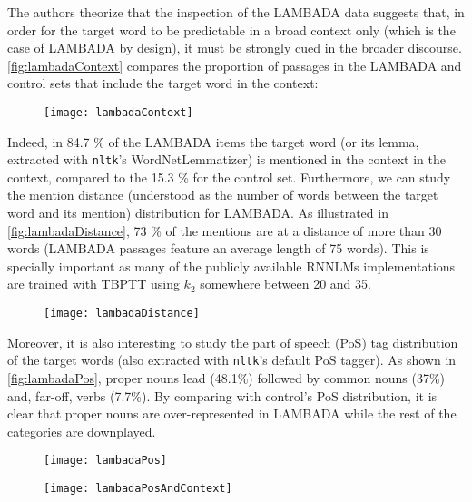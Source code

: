 The authors theorize that the inspection of the LAMBADA data suggests that, in order for the target word to be predictable in a broad context only (which is the case of LAMBADA by design), it must be strongly cued in the broader discourse. \autoref{fig:lambadaContext} compares the proportion of passages in the LAMBADA and control sets that include the target word in the context:

\begin{figure}[H]
	\centering
	\texttt{[image: lambadaContext]}
	\label{fig:lambadaContext}
\end{figure}

Indeed, in 84.7 \% of the LAMBADA items the target word (or its lemma, extracted with \texttt{nltk}'s WordNetLemmatizer) is mentioned in the context in the context, compared to the 15.3 \% for the control set. Furthermore, we can study the mention distance (understood as the number of words between the target word and its mention) distribution for LAMBADA. As illustrated in \autoref{fig:lambadaDistance}, 73 \% of the mentions are at a distance of more than 30 words (LAMBADA passages feature an average length of 75 words). This is specially important as many of the publicly available RNNLMs implementations are trained with TBPTT using $k_2$ somewhere between 20 and 35.
 
\begin{figure}[H]
	\centering
	\texttt{[image: lambadaDistance]}
	\label{fig:lambadaDistance}
\end{figure}

Moreover, it is also interesting to study the part of speech (PoS) tag distribution of the target words (also extracted with \texttt{nltk}'s default PoS tagger). As shown in \autoref{fig:lambadaPos}, proper nouns lead (48.1\%) followed by common nouns (37\%) and, far-off, verbs
(7.7\%). By comparing with control's PoS distribution, it is clear that proper nouns are over-represented in LAMBADA while the rest of the categories are downplayed.

\begin{figure}[H]
	\centering
	\texttt{[image: lambadaPos]}
	\label{fig:lambadaPos}
\end{figure}

\begin{figure}[H]
	\centering
	\texttt{[image: lambadaPosAndContext]}
	\label{fig:lambadaPosAndContext}
\end{figure}

